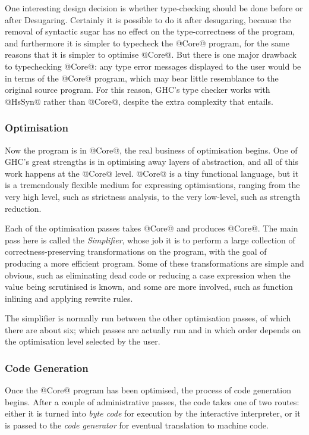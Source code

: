 \documentclass{article}
\begin{document}
One interesting design decision is whether type-checking should be
done before or after Desugaring.  Certainly it is possible to do it
after desugaring, because the removal of syntactic sugar has no effect
on the type-correctness of the program, and furthermore it is simpler
to typecheck the @Core@ program, for the same reasons that it is
simpler to optimise @Core@.  But there is one major drawback to
typechecking @Core@: any type error messages displayed to the user
would be in terms of the @Core@ program, which may bear little
resemblance to the original source program.  For this reason, GHC's
type checker works with @HsSyn@ rather than @Core@, despite the extra
complexity that entails.

\subsubsection{Optimisation}

Now the program is in @Core@, the real business of optimisation
begins.  One of GHC's great strengths is in optimising away layers of
abstraction, and all of this work happens at the @Core@ level.  @Core@
is a tiny functional language, but it is a tremendously flexible
medium for expressing optimisations, ranging from the very high level,
such as strictness analysis, to the very low-level, such as strength
reduction.

Each of the optimisation passes takes @Core@ and produces
@Core@.  The main pass here is called the \emph{Simplifier}, whose job
it is to perform a large collection of correctness-preserving
transformations on the program, with the goal of producing a more
efficient program.  Some of these transformations are simple and
obvious, such as eliminating dead code or reducing a case expression
when the value being scrutinised is known, and some are more involved,
such as function inlining and applying rewrite rules.

The simplifier is normally run between the other optimisation passes,
of which there are about six; which passes are actually run and in
which order depends on the optimisation level selected by the user.

\subsubsection{Code Generation}

Once the @Core@ program has been optimised, the process of code
generation begins.  After a couple of administrative passes, the code
takes one of two routes: either it is turned into \emph{byte code} for
execution by the interactive interpreter, or it is passed to the
\emph{code generator} for eventual translation to machine code.
\end{document}
